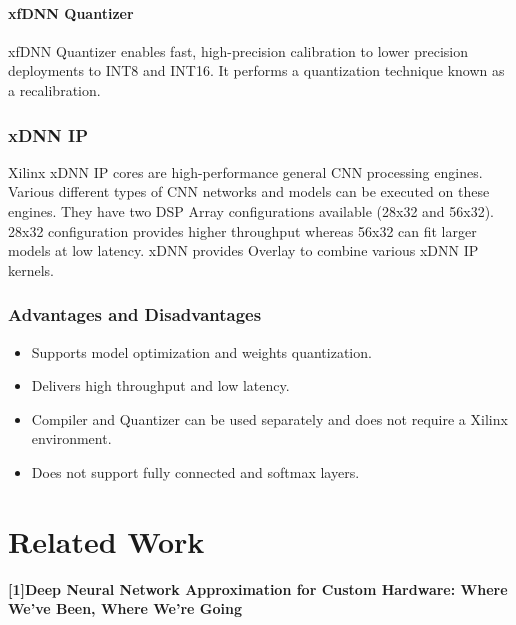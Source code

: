 \documentclass[titlepage]{report}
\begin{document}
\subsubsection{xfDNN Quantizer} 

xfDNN Quantizer enables fast, high-precision calibration to lower precision deployments to INT8 and INT16. It performs a quantization technique known as a recalibration.

\subsection{xDNN IP}
Xilinx xDNN IP cores are high-performance general CNN processing engines. Various different types of CNN networks and models can be executed on these engines. They have two DSP Array configurations available (28x32 and 56x32). 28x32 configuration provides higher throughput whereas 56x32 can fit larger models at low latency.
xDNN provides Overlay to combine various xDNN IP kernels.

\subsection{Advantages and Disadvantages}
  
 \begin{itemize}
 \item Supports model optimization and weights quantization.
 \item Delivers high throughput and low latency.
 \item Compiler and Quantizer can be used separately and does not require a Xilinx environment.
 \item Does not support fully connected and softmax layers.
 
 \end{itemize}




\chapter{Related Work}
\textbf{[1]Deep Neural Network Approximation for Custom Hardware: Where We've Been, Where We're Going}
\end{document}
